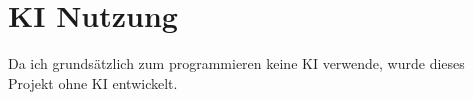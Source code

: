 \section{KI Nutzung}
Da ich grundsätzlich zum programmieren keine KI verwende, wurde dieses Projekt ohne KI entwickelt.
